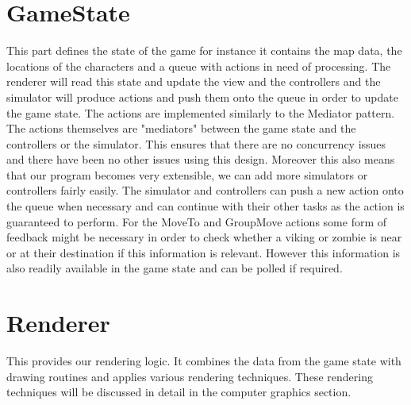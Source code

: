 \section{GameState}
This part defines the state of the game for instance it contains the map data, the locations of the characters and a queue with actions in need of processing. The renderer will read this state and update the view and the controllers and the simulator will produce actions and push them onto the queue in order to update the game state. The actions are implemented similarly to the Mediator pattern. The actions themselves are "mediators" between the game state and the controllers or the simulator.
This ensures that there are no concurrency issues and there have been no other issues using this design. Moreover this also means that our program becomes very extensible, we can add more simulators or controllers fairly easily. The simulator and controllers can push a new action onto the queue when necessary and can continue with their other tasks as the action is guaranteed to perform. For the MoveTo and GroupMove actions some form of feedback might be necessary in order to check whether a viking or zombie is near or at their destination if this information is relevant. However this information is also readily available in the game state and can be polled if required. 
\section{Renderer}
This provides our rendering logic. It combines the data from the game state with drawing routines and applies various rendering techniques. These rendering techniques will be discussed in detail in the computer graphics section.
